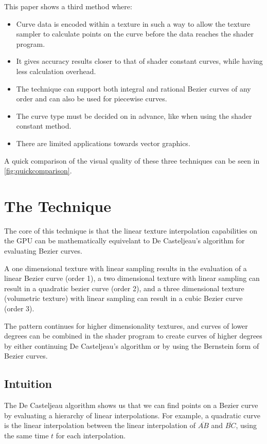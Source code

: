 \documentclass{jcgt}
\begin{document}
This paper shows a third method where:
\begin{itemize}
  \item Curve data is encoded within a texture in such a way to allow the texture sampler to calculate points on the curve before the data reaches the shader program.
  \item It gives accuracy results closer to that of shader constant curves, while having less calculation overhead.
  \item The technique can support both integral and rational Bezier curves of any order and can also be used for piecewise curves.
  \item The curve type must be decided on in advance, like when using the shader constant method.
  \item There are limited applications towards vector graphics.
\end{itemize}

A quick comparison of the visual quality of these three techniques can be seen in \autoref{fig:quickcomparison}.

\section{The Technique}
\label{sec:thetechnique}

The core of this technique is that the linear texture interpolation capabilities on the GPU can be mathematically equivelant to De Casteljeau's algorithm for evaluating Bezier curves.

A one dimensional texture with linear sampling results in the evaluation of a linear Bezier curve (order 1), a two dimensional texture with linear sampling can result in a quadratic bezier curve (order 2), and a three dimensional texture (volumetric texture) with linear sampling can result in a cubic Bezier curve (order 3).

The pattern continues for higher dimensionality textures, and curves of lower degrees can be combined in the shader program to create curves of higher degrees by either continuing De Casteljeau's algorithm or by using the Bernstein form of Bezier curves.

\subsection{Intuition}

The De Casteljeau algorithm shows us that we can find points on a Bezier curve by evaluating a hierarchy of linear interpolations.  For example, a quadratic curve is the linear interpolation between the linear interpolation of {$\overline{AB}$} and {$\overline{BC}$}, using the same time $t$ for each interpolation.
\end{document}
